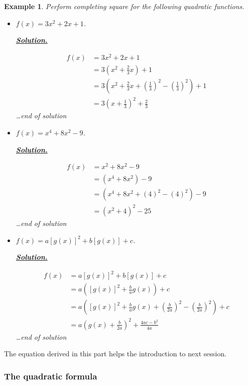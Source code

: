 \documentclass[12pt]{article}
\newtheorem*{example}{Example}
\newenvironment{solution}{\begin{snugshade*} \underline{\textbf{Solution.}} \par}{\hfill \textit{\dots end of solution} \end{snugshade*}}
\begin{document}
    \begin{example}
        Perform completing square for the following quadratic functions.\begin{itemize}
            \item $f(x)=3x^2+2x+1$.\begin{solution}
                \begin{align*}
                    f(x)&=3x^2+2x+1\\
                    &=3(x^2+\frac{2}{3}x)+1\\
                    &=3(x^2+\frac{2}{3}x+(\frac{1}{3})^2-(\frac{1}{3})^2)+1\\
                    &=3(x+\frac{1}{3})^2+\frac{2}{3}
                \end{align*}
            \end{solution}
            \item $f(x)=x^4+8x^2-9$.\begin{solution}
                \begin{align*}
                    f(x)&=x^2+8x^2-9\\
                    &=(x^4+8x^2)-9\\
                    &=(x^4+8x^2+(4)^2-(4)^2)-9\\
                    &=(x^2+4)^2-25
                \end{align*}
            \end{solution}
            \item $f(x)=a[g(x)]^2+b[g(x)]+c$.\begin{solution}
                \begin{align*}
                    f(x)&=a[g(x)]^2+b[g(x)]+c\\
                    &=a([g(x)]^2+\frac{b}{a}g(x))+c\\
                    &=a([g(x)]^2+\frac{b}{a}g(x)+(\frac{b}{2a})^2-(\frac{b}{2a})^2)+c\\
                    &=a(g(x)+\frac{b}{2a})^2+\frac{4ac-b^2}{4a}
                \end{align*}
            \end{solution}
        \end{itemize}
    \end{example}

    The equation derived in this part helps the introduction to next session.

    \subsubsection*{The quadratic formula}
\end{document}
